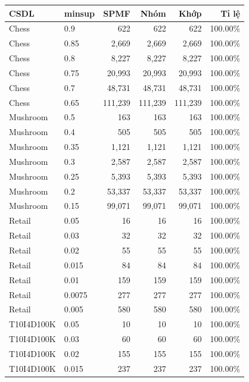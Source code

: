 \begin{tabular}{llrrrr}
\toprule
CSDL & minsup & SPMF & Nhóm & Khớp & Tỉ lệ \\
\midrule
Chess & 0.9 & 622 & 622 & 622 & 100.00\% \\
Chess & 0.85 & 2{,}669 & 2{,}669 & 2{,}669 & 100.00\% \\
Chess & 0.8 & 8{,}227 & 8{,}227 & 8{,}227 & 100.00\% \\
Chess & 0.75 & 20{,}993 & 20{,}993 & 20{,}993 & 100.00\% \\
Chess & 0.7 & 48{,}731 & 48{,}731 & 48{,}731 & 100.00\% \\
Chess & 0.65 & 111{,}239 & 111{,}239 & 111{,}239 & 100.00\% \\
Mushroom & 0.5 & 163 & 163 & 163 & 100.00\% \\
Mushroom & 0.4 & 505 & 505 & 505 & 100.00\% \\
Mushroom & 0.35 & 1{,}121 & 1{,}121 & 1{,}121 & 100.00\% \\
Mushroom & 0.3 & 2{,}587 & 2{,}587 & 2{,}587 & 100.00\% \\
Mushroom & 0.25 & 5{,}393 & 5{,}393 & 5{,}393 & 100.00\% \\
Mushroom & 0.2 & 53{,}337 & 53{,}337 & 53{,}337 & 100.00\% \\
Mushroom & 0.15 & 99{,}071 & 99{,}071 & 99{,}071 & 100.00\% \\
Retail & 0.05 & 16 & 16 & 16 & 100.00\% \\
Retail & 0.03 & 32 & 32 & 32 & 100.00\% \\
Retail & 0.02 & 55 & 55 & 55 & 100.00\% \\
Retail & 0.015 & 84 & 84 & 84 & 100.00\% \\
Retail & 0.01 & 159 & 159 & 159 & 100.00\% \\
Retail & 0.0075 & 277 & 277 & 277 & 100.00\% \\
Retail & 0.005 & 580 & 580 & 580 & 100.00\% \\
T10I4D100K & 0.05 & 10 & 10 & 10 & 100.00\% \\
T10I4D100K & 0.03 & 60 & 60 & 60 & 100.00\% \\
T10I4D100K & 0.02 & 155 & 155 & 155 & 100.00\% \\
T10I4D100K & 0.015 & 237 & 237 & 237 & 100.00\% \\
\bottomrule
\end{tabular}